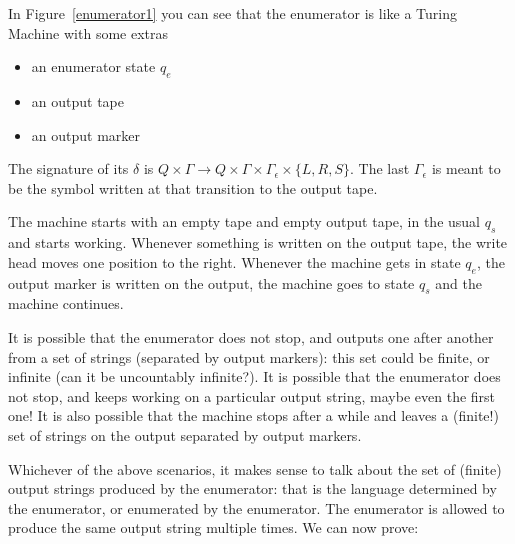 In Figure~\ref{enumerator1} you can see  that the enumerator is like a
Turing Machine with some extras
\begin{itemize}
\item an enumerator state $q_e$
\item an output tape
\item an output marker
\end{itemize}
The signature of its $\delta$ is
%
$Q \times \Gamma \rightarrow Q \times \Gamma \times \Gamma_\epsilon \times \{L,R,S\}$.
The last $\Gamma_\epsilon$ is meant to be the symbol written at that
transition to the output tape.


The machine starts with an empty tape and empty output tape, in the
usual $q_s$ and starts working. Whenever something is written on the
output tape, the write head moves one position to the right. Whenever
the machine gets in state $q_e$, the output marker is written on the
output, the machine goes to state $q_s$ and the machine continues.

It is possible that the enumerator does not stop, and outputs one
after another from a set of strings (separated by output markers):
this set could be finite, or infinite (can it be uncountably
infinite?). It is possible that the enumerator does not stop, and
keeps working on a particular output string, maybe even the first one!
It is also possible that the machine stops after a while and leaves a (finite!) set of strings on
the output separated by output markers.

Whichever of the above scenarios, it makes sense to talk about the set
of (finite) output strings produced by the enumerator: that is the
language determined by the enumerator, or enumerated by the
enumerator. The enumerator is allowed to produce the same output
string multiple times. We can now prove:

